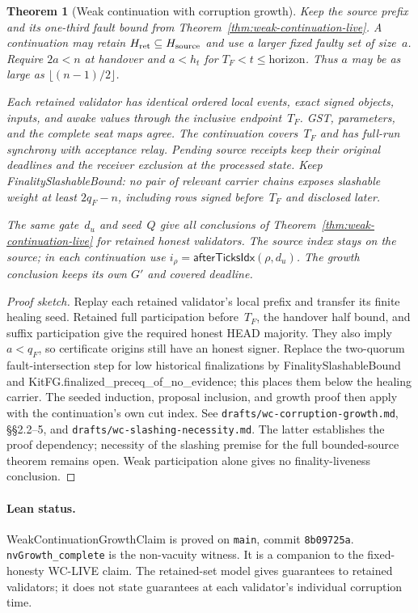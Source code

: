 \documentclass{article}
\theoremstyle{plain}
\newtheorem{theorem}{Theorem}
\theoremstyle{definition}
\theoremstyle{remark}
\begin{document}
\begin{theorem}[Weak continuation with corruption growth]
\label{thm:weak-continuation-growth}
Keep the source prefix and its one-third fault bound from
Theorem~\ref{thm:weak-continuation-live}.  A continuation may retain
$H_{\rm ret}\subseteq H_{\rm source}$ and use a larger fixed faulty
set of size~$a$.  Require $2a<n$ at handover and $a<h_t$ for
$T_F<t\leq\mathrm{horizon}$.  Thus $a$ may be as large as
$\lfloor(n-1)/2\rfloor$.

Each retained validator has identical ordered local events, exact
signed objects, inputs, and awake values through the inclusive
endpoint~$T_F$.  GST, parameters, and the complete seat maps agree.
The continuation covers~$T_F$ and has full-run synchrony with
acceptance relay.  Pending source receipts keep their original
deadlines and the receiver exclusion at the processed state.
Keep \textsf{FinalitySlashableBound}: no pair of relevant carrier
chains exposes slashable weight at least $2q_F-n$, including rows
signed before~$T_F$ and disclosed later.

The same gate~$d_u$ and seed~$Q$ give all conclusions of
Theorem~\ref{thm:weak-continuation-live} for retained honest validators.
The source index stays on the source; in each continuation use
$i_\rho=\mathsf{afterTicksIdx}(\rho,d_u)$.  The growth conclusion
keeps its own $G'$ and covered deadline.
\end{theorem}

\begin{proof}[Proof sketch]
Replay each retained validator's local prefix and transfer its finite
healing seed.  Retained full participation before~$T_F$, the handover
half bound, and suffix participation give the required honest HEAD
majority.  They also imply $a<q_F$, so certificate origins still have
an honest signer.  Replace the two-quorum fault-intersection step for
low historical finalizations by \textsf{FinalitySlashableBound} and
\textsf{KitFG.finalized\_preceq\_of\_no\_evidence}; this places them
below the healing carrier.  The seeded induction, proposal inclusion,
and growth proof then apply with the continuation's own cut index.
See \nolinkurl{drafts/wc-corruption-growth.md}, \S\S2.2--5, and
\nolinkurl{drafts/wc-slashing-necessity.md}.  The latter establishes
the proof dependency; necessity of the slashing premise for the full
bounded-source theorem remains open.  Weak participation alone gives
no finality-liveness conclusion.
\end{proof}

\paragraph{Lean status.}
\textsf{WeakContinuationGrowthClaim} is proved on \texttt{main},
commit \texttt{8b09725a}.  \nolinkurl{nvGrowth_complete} is the non-vacuity witness.  It is a
companion to the fixed-honesty WC-LIVE claim.  The retained-set model
gives guarantees to retained validators; it does not state guarantees
at each validator's individual corruption time.
\end{document}
